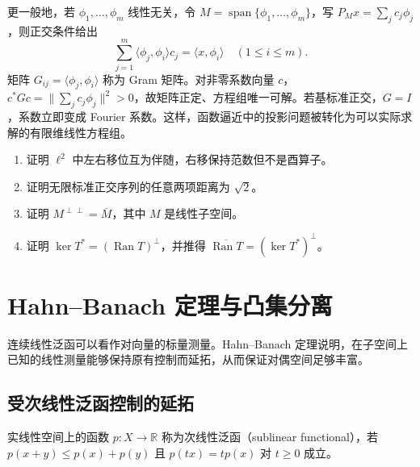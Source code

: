 \documentclass[UTF8,12pt,a4paper,fontset=fandol]{ctexbook}
\begin{document}
更一般地，若 $\phi_1,\ldots,\phi_m$ 线性无关，令 $M=\operatorname{span}\{\phi_1,\ldots,\phi_m\}$，写 $P_Mx=\sum_jc_j\phi_j$，则正交条件给出
\[
 \sum_{j=1}^m\langle\phi_j,\phi_i\rangle c_j=\langle x,\phi_i\rangle
 \quad(1\leq i\leq m).
\]
矩阵 $G_{ij}=\langle\phi_j,\phi_i\rangle$ 称为 Gram 矩阵。对非零系数向量 $c$，$c^*Gc=\|\sum_jc_j\phi_j\|^2>0$，故矩阵正定、方程组唯一可解。若基标准正交，$G=I$，系数立即变成 Fourier 系数。这样，函数逼近中的投影问题被转化为可以实际求解的有限维线性方程组。
\begin{enumerate}
 \item\label{exer:fa-shift-adjoint} 证明 $\ell^2$ 中左右移位互为伴随，右移保持范数但不是酉算子。
 \item 证明无限标准正交序列的任意两项距离为 $\sqrt2$。
 \item\label{exer:fa-double-perp} 证明 $M^{\perp\perp}=\overline M$，其中 $M$ 是线性子空间。
 \item 证明 $\ker T^*=(\operatorname{Ran}T)^\perp$，并推得 $\overline{\operatorname{Ran}T}=(\ker T^*)^\perp$。
\end{enumerate}

\chapter{Hahn--Banach 定理与凸集分离}
\label{chap:fa-hahn-banach}

连续线性泛函可以看作对向量的标量测量。Hahn--Banach 定理说明，在子空间上已知的线性测量能够保持原有控制而延拓，从而保证对偶空间足够丰富。

\section{受次线性泛函控制的延拓}
实线性空间上的函数 $p:X\to\mathbb R$ 称为次线性泛函（sublinear functional），若 $p(x+y)\leq p(x)+p(y)$ 且 $p(tx)=tp(x)$ 对 $t\geq0$ 成立。
\end{document}
